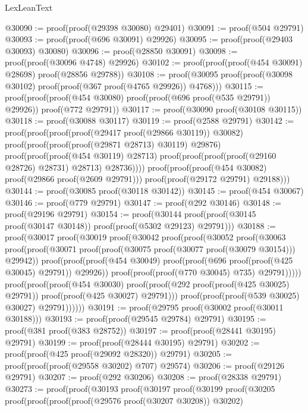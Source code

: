 \begin{lexlean}{LexLeanText}
\begin{coremodule}
@30090 := proof(proof(@29398 @30080) @29401)
@30091 := proof(@504 @29791)
@30093 := proof(proof(@696 @30091) @29926)
@30095 := proof(proof(@29403 @30093) @30080)
@30096 := proof(@28850 @30091)
@30098 := proof(proof(@30096 @4748) @29926)
@30102 := proof(proof(proof(@454 @30091) @28698) proof(@28856 @29788))
@30108 := proof(@30095 proof(proof(@30098 @30102) proof(proof(@367 proof(@4765 @29926)) @4768)))
@30115 := proof(proof(proof(@454 @30080) proof(proof(@696 proof(@535 @29791)) @29926))
      proof(@772 @29791))
@30117 := proof(@30090 proof(@30108 @30115))
@30118 := proof(@30088 @30117)
@30119 := proof(@2588 @29791)
@30142 := proof(proof(proof(proof(@29417 proof(@29866 @30119)) @30082)
        proof(proof(proof(proof(@29871 @28713) @30119) @29876)
            proof(proof(proof(@454 @30119) @28713)
                proof(proof(proof(proof(@29160 @28726) @28731) @28713) @28736))))
      proof(proof(proof(@454 @30082) proof(@29866 proof(@2609 @29791)))
          proof(proof(@29172 @29791) @29188)))
@30144 := proof(@30085 proof(@30118 @30142))
@30145 := proof(@454 @30067)
@30146 := proof(@779 @29791)
@30147 := proof(@292 @30146)
@30148 := proof(@29196 @29791)
@30154 := proof(@30144 proof(proof(@30145 proof(@30147 @30148)) proof(proof(@5302 @29123) @29791)))
@30188 := proof(@30017
      proof(@30019
          proof(@30042
              proof(proof(@30052
                    proof(@30063
                        proof(proof(@30071
                              proof(proof(@30075 proof(@30077 proof(@30079 @30154))) @29942))
                            proof(proof(proof(@454 @30049)
                                  proof(proof(@696 proof(proof(@425 @30045) @29791)) @29926))
                                proof(proof(proof(@770 @30045) @735) @29791)))))
                  proof(proof(proof(@454 @30030)
                        proof(proof(@292 proof(proof(@425 @30025) @29791))
                            proof(proof(@425 @30027) @29791)))
                      proof(proof(proof(@539 @30025) @30027) @29791))))))
@30191 := proof(@29795 proof(@30002 proof(@30011 @30188)))
@30193 := proof(proof(@29545 @29784) @29791)
@30195 := proof(@381 proof(@383 @28752))
@30197 := proof(proof(@28441 @30195) @29791)
@30199 := proof(proof(@28444 @30195) @29791)
@30202 := proof(proof(@425 proof(@29092 @28320)) @29791)
@30205 := proof(proof(proof(@29558 @30202) @707) @29574)
@30206 := proof(@29126 @29791)
@30207 := proof(@292 @30206)
@30208 := proof(@28338 @29791)
@30273 := proof(proof(@30193
        proof(@30197
            proof(@30199
                proof(@30205
                    proof(proof(proof(proof(@29576 proof(@30207 @30208)) @30202)

\end{coremodule}
\end{lexlean}
